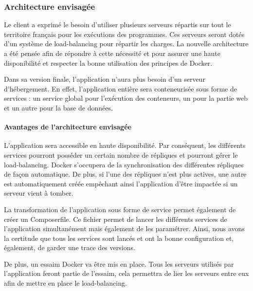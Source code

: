 \subsubsection{Architecture envisagée}

\par Le client a exprimé le besoin d'utiliser plusieurs serveurs répartis sur tout le territoire français pour les exécutions des programmes. Ces serveurs seront dotés d'un système de load-balancing pour répartir les charges.
La nouvelle architecture a été pensée afin de répondre à cette nécessité et pour assurer une haute disponibilité et respecter la bonne utilisation des principes de Docker.

\par Dans sa version finale, l’application n’aura plus besoin d’un serveur d’hébergement. En effet, l’application entière sera conteneurisée sous forme de services : un service global pour l’exécution des conteneurs, un pour la partie web et un autre pour la base de données.

\paragraph{Avantages de l'architecture envisagée}

\par L’application sera accessible en haute disponibilité. Par conséquent, les différents services pourront posséder un certain nombre de répliques et pourront gérer le load-balancing. Docker s'occupera de la synchronisation des différentes répliques de façon automatique. De plus, si l’une des répliques n’est plus actives, une autre est automatiquement créée empêchant ainsi l'application d'être impactée si un serveur vient à tomber. 

\par La transformation de l’application sous forme de service permet également de créer un Composerfile. Ce fichier permet de lancer les différents services de l’application simultanément mais également de les paramétrer. Ainsi, nous avons la certitude que tous les services sont lancés et ont la bonne configuration et, également, de garder une trace des versions.

\par De plus, un essaim Docker va être mis en place. Tous les serveurs utilisés par l’application feront partie de l’essaim, cela permettra de lier les serveurs entre eux afin de mettre en place le load-balancing.

\\

